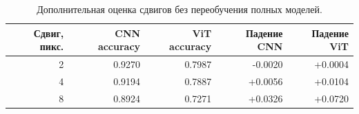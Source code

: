 \begin{table}[H]\centering\small
\setlength{\tabcolsep}{4pt}
\caption{Дополнительная оценка сдвигов без переобучения полных моделей.}\label{tab:translation}
\begin{tabular}{rrrrr}
\toprule
Сдвиг, пикс. & CNN accuracy & ViT accuracy & Падение CNN & Падение ViT \\
\midrule
2 & 0.9270 & 0.7987 & -0.0020 & +0.0004 \\
4 & 0.9194 & 0.7887 & +0.0056 & +0.0104 \\
8 & 0.8924 & 0.7271 & +0.0326 & +0.0720 \\
\bottomrule
\end{tabular}
\end{table}
